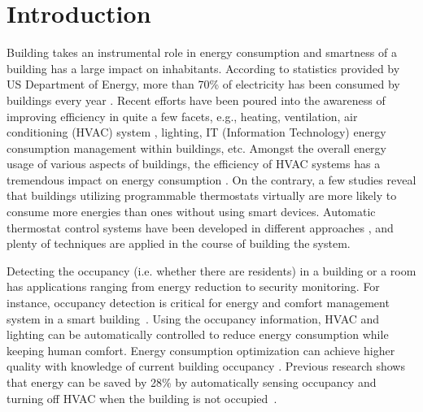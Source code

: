 \section{Introduction}
\label{sec:intro}
Building takes an instrumental role in energy consumption and smartness of a
building has a large impact on inhabitants. \textcolor{feb18rev}{According to
statistics provided by US Department of Energy, more than 70\% of electricity
has been consumed by buildings every year \cite{doe_annual}. Recent efforts
have been poured into the awareness of
improving efficiency in quite a few facets, e.g., heating, ventilation, air
conditioning (HVAC) system \cite{erickson2009energy}\cite{gao2009selfprog},
lighting\cite{delaney2009eval}, IT (Information Technology) energy consumption management within
buildings\cite{agarwal2009augnet}\cite{agarwal2010sleep}, etc.} Amongst the
overall energy usage of various aspects of buildings, the efficiency of HVAC
systems has a tremendous impact on energy consumption \cite{hobby2012analysis}.
On the contrary, a few studies \cite{bias1999elec} reveal that buildings
utilizing programmable thermostats virtually are more likely to consume more
energies than ones without using smart devices. Automatic thermostat control
systems have been developed in different approaches
\cite{thomas2012intelligent}\cite{lu2012eval}, and plenty of techniques are
applied in the course of building the system.

Detecting the occupancy (i.e. whether there are residents) in a building or a
room has applications ranging from energy reduction to security monitoring. For
instance, occupancy detection is critical for energy and comfort management
system in a smart building~\cite{Nguyen2013Energy}.  Using the occupancy
information, HVAC and lighting can be automatically controlled to reduce energy
consumption while keeping human comfort. Energy consumption optimization can
achieve higher quality with knowledge of current building occupancy
\cite{majumdar2014energy}. Previous research shows that energy
can be saved by 28\% by automatically sensing occupancy and turning off HVAC
when the building is not occupied~\cite{Lu:SenSys10}.

